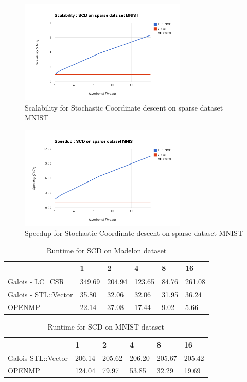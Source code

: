 \documentclass{sigplanconf}
\begin{document}
{\begin{figure}[ht!]
\centering
\includegraphics[width=80mm]{scd_scale_sparse.png}
\caption{Scalability for Stochastic Coordinate descent on sparse dataset MNIST }
\label{fig:sc_scd_mnist}
\end{figure}

\begin{figure}[ht!]
\centering
\includegraphics[width=80mm]{scd_speed_sparse.png}
\caption{Speedup for Stochastic Coordinate descent on sparse dataset MNIST }
\label{fig:sp_scd_mnist}
\end{figure}

\begin{table}[htbp]
\caption{Runtime for SCD on Madelon dataset}
\begin{tabular}{|p{7em}|p{2.5em}|p{2.5em}|p{2.5em}|p{2em}|p{2.5em}|}
\hline
 & 1 & 2 & 4 & 8 & 16 \\ \hline
Galois - LC\_CSR & 349.69 & 204.94 & 123.65 & 84.76 & 261.08 \\ \hline
Galois - STL::Vector  & 35.80 & 32.06 & 32.06 & 31.95 & 36.24 \\ \hline
OPENMP & 22.14 & 37.08 & 17.44 & 9.02 & 5.66 \\ \hline
\end{tabular}
\label{tb:scd_madelon}
\end{table}

\begin{table}[htbp]
\caption{Runtime for SCD on MNIST dataset}
\begin{tabular}{|p{7em}|p{2.5em}|p{2.5em}|p{2.5em}|p{2em}|p{2.5em}|}
\hline
 & 1 & 2 & 4 & 8 & 16 \\ \hline
Galois STL::Vector & 206.14 & 205.62 & 206.20 & 205.67 & 205.42 \\ \hline
OPENMP & 124.04 & 79.97 & 53.85 & 32.29 & 19.69 \\ \hline
\end{tabular}
\label{tb:scd_mnist}
\end{table}


}
\end{document}
